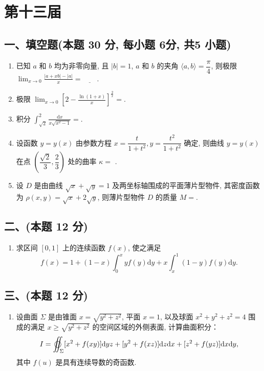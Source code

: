 \newpage
\section{第十三届}

\subsection*{一、填空题(本题 30 分,  每小题 6分,  共5 小题)}
\begin{enumerate}
    \item 已知 $a$ 和 $b$ 均为非零向量, 且 $|b| = 1$, $a$ 和 $b$ 的夹角 $\langle a, b \rangle = \dfrac{\pi}{4}$, 则极限
          $\displaystyle\lim_{x \to 0} \frac{|a + xb| - |a|}{x} = \underline{\quad \quad}.$
    \item 极限 $\displaystyle\lim_{x \to 0} \left[ 2 - \frac{\ln(1 + x)}{x} \right]^{\frac{2}{x}} =$\underline{\quad \quad}.
    \item 积分 $\displaystyle\int_{\sqrt{2}}^{2} \frac{\mathrm{d}x}{x \sqrt{x^2 - 1}} =$\underline{\quad \quad}.
    \item 设函数 $y = y(x)$ 由参数方程 $x = \dfrac{t}{1 + t^2}, y = \dfrac{t^2}{1 + t^2}$ 确定, 则曲线 $y = y(x)$ 在点 $\left( \dfrac{\sqrt{2}}{3}, \dfrac{2}{3} \right)$ 处的曲率 $\kappa =$ \underline{\quad \quad}.
    \item 设 $D$ 是由曲线 $\sqrt{x} + \sqrt{y} = 1$ 及两坐标轴围成的平面薄片型物件, 其密度函数为 $\rho(x, y) = \sqrt{x} + 2\sqrt{y}$, 则薄片型物件 $D$ 的质量 $M =$\underline{\quad \quad}.
\end{enumerate}

\subsection*{二、(本题 12 分)}
\begin{enumerate}[start=6]
    \item 求区间 $[0, 1]$ 上的连续函数 $f(x)$, 使之满足
          \[
              f(x) = 1 + (1 - x) \int_{0}^{x} y f(y) \mathrm{d}y + x \int_{x}^{1} (1 - y) f(y) \mathrm{d}y.
          \]
\end{enumerate}

\subsection*{三、(本题 12 分)}
\begin{enumerate}[start=7]
    \item 设曲面 $\Sigma$ 是由锥面 $x = \sqrt{y^2 + z^2}$, 平面 $x = 1$, 以及球面 $x^2 + y^2 + z^2 = 4$ 围成的满足 $x \geqslant \sqrt{y^2 + z^2}$ 的空间区域的外侧表面, 计算曲面积分：
          \[
              I = \varoiint_{\Sigma} [x^2 + f(xy)] \mathrm{d}yz + [y^2 + f(xz)] \mathrm{d}z \mathrm{d}x + [z^2 + f(yz)] \mathrm{d}x \mathrm{d}y,
          \]
          其中 $f(u)$ 是具有连续导数的奇函数.
\end{enumerate}

